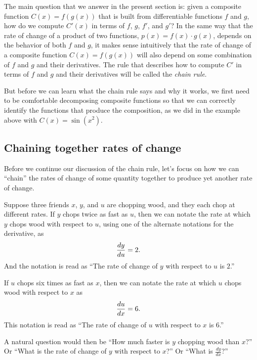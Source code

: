 The main question that we answer in the present section is: given a composite function $C(x) = f(g(x))$ that is built from differentiable functions $f$ and $g$, how do we compute $C'(x)$ in terms of $f$, $g$, $f'$, and $g'$?  In the same way that the rate of change of a product of two functions, $p(x) = f(x) \cdot g(x)$, depends on the behavior of both $f$ and $g$, it makes sense intuitively that the rate of change of a composite function $C(x) = f(g(x))$ will also depend on some combination of $f$ and $g$ and their derivatives.  The rule that describes how to compute $C'$ in terms of $f$ and $g$ and their derivatives will be called the \emph{chain rule}.

But before we can learn what the chain rule says and why it works, we first need to be comfortable decomposing composite functions so that we can correctly identify the functions that produce the composition, as we did in the example above with $C(x) = \sin(x^2).$ 


\subsection{Chaining together rates of change}

Before we continue our discussion of the chain rule, let's focus on how we can ``chain'' the rates of change of some quantity together to produce yet another rate of change.

Suppose three friends $x$, $y$, and $u$ are chopping wood, and they each chop at different rates. If $y$ chops twice as fast as $u$, then we can notate the rate at which $y$ chops wood with respect to $u$, using one of the alternate notations for the derivative, as
\[ \displaystyle \frac{dy}{du} = 2. \]
And the notation is read as ``The rate of change of $y$ with respect to $u$ is $2$.''

If $u$ chops six times as fast as $x$, then we can notate the rate at which $u$ chops wood with respect to $x$ as
\[ \displaystyle \frac{du}{dx} = 6. \]
This notation is read as ``The rate of change of $u$ with respect to $x$ is 6.''

A natural question would then be ``How much faster is $y$ chopping wood than $x$?'' Or ``What is the rate of change of $y$ with respect to $x$?'' Or ``What is $\frac{dy}{dx}$?''

